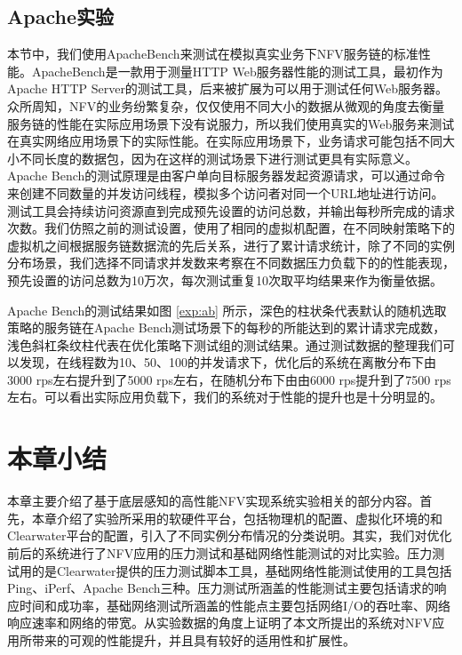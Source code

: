 \subsection{Apache实验}
本节中，我们使用ApacheBench来测试在模拟真实业务下NFV服务链的标准性能。ApacheBench是一款用于测量HTTP Web服务器性能的测试工具，最初作为Apache HTTP Server的测试工具，后来被扩展为可以用于测试任何Web服务器。众所周知，NFV的业务纷繁复杂，仅仅使用不同大小的数据从微观的角度去衡量服务链的性能在实际应用场景下没有说服力，所以我们使用真实的Web服务来测试在真实网络应用场景下的实际性能。在实际应用场景下，业务请求可能包括不同大小不同长度的数据包，因为在这样的测试场景下进行测试更具有实际意义。Apache Bench的测试原理是由客户单向目标服务器发起资源请求，可以通过命令来创建不同数量的并发访问线程，模拟多个访问者对同一个URL地址进行访问。测试工具会持续访问资源直到完成预先设置的访问总数，并输出每秒所完成的请求次数。我们仿照之前的测试设置，使用了相同的虚拟机配置，在不同映射策略下的虚拟机之间根据服务链数据流的先后关系，进行了累计请求统计，除了不同的实例分布场景，我们选择不同请求并发数来考察在不同数据压力负载下的的性能表现，预先设置的访问总数为10万次，每次测试重复10次取平均结果来作为衡量依据。
\begin{figure}[!htp]
	\centering
\end{figure}
\begin{figure}
\addtocounter{subfigure}{2}
\ContinuedFloat
\centering
\end{figure}

Apache Bench的测试结果如图 \ref{exp:ab} 所示，深色的柱状条代表默认的随机选取策略的服务链在Apache Bench测试场景下的每秒的所能达到的累计请求完成数，浅色斜杠条纹柱代表在优化策略下测试组的测试结果。通过测试数据的整理我们可以发现，在线程数为10、50、100的并发请求下，优化后的系统在离散分布下由3000 rps左右提升到了5000 rps左右，在随机分布下由由6000 rps提升到了7500 rps左右。可以看出实际应用负载下，我们的系统对于性能的提升也是十分明显的。

\newpage
\section{本章小结}
本章主要介绍了基于底层感知的高性能NFV实现系统实验相关的部分内容。首先，本章介绍了实验所采用的软硬件平台，包括物理机的配置、虚拟化环境的和Clearwater平台的配置，引入了不同实例分布情况的分类说明。其实，我们对优化前后的系统进行了NFV应用的压力测试和基础网络性能测试的对比实验。压力测试用的是Clearwater提供的压力测试脚本工具，基础网络性能测试使用的工具包括Ping、iPerf、Apache Bench三种。压力测试所涵盖的性能测试主要包括请求的响应时间和成功率，基础网络测试所涵盖的性能点主要包括网络I/O的吞吐率、网络响应速率和网络的带宽。从实验数据的角度上证明了本文所提出的系统对NFV应用所带来的可观的性能提升，并且具有较好的适用性和扩展性。